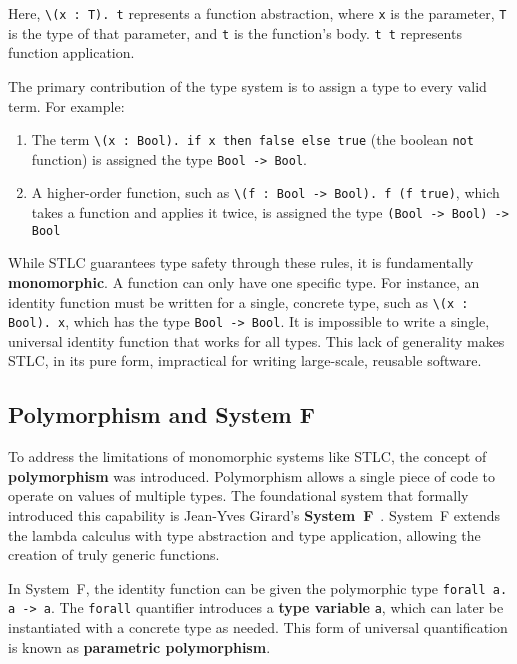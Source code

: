 Here, \texttt{\textbackslash(x : T). t} represents a function abstraction, where \texttt{x} is the parameter, \texttt{T} is the type of that parameter, and \texttt{t} is the function's body. \texttt{t t} represents function application.

The primary contribution of the type system is to assign a type to every valid term. For example:

\begin{enumerate}
    \item The term \texttt{\textbackslash(x : Bool). if x then false else true} (the boolean \texttt{not} function) is assigned the type \texttt{Bool -> Bool}.

    \item A higher-order function, such as \texttt{\textbackslash(f : Bool -> Bool). f (f true)}, which takes a function and applies it twice, is assigned the type \texttt{(Bool -> Bool) -> Bool}
\end{enumerate}

While STLC guarantees type safety through these rules, it is fundamentally \textbf{monomorphic}. A function can only have one specific type. For instance, an identity function must be written for a single, concrete type, such as \texttt{\textbackslash(x : Bool). x}, which has the type \texttt{Bool -> Bool}. It is impossible to write a single, universal identity function that works for all types. This lack of generality makes STLC, in its pure form, impractical for writing large-scale, reusable software.

\subsection{Polymorphism and System F}
\label{chap:LiteratureReview:sec:PolymorphismAndSystemF}

To address the limitations of monomorphic systems like STLC, the concept of \textbf{polymorphism} was introduced. Polymorphism allows a single piece of code to operate on values of multiple types. The foundational system that formally introduced this capability is Jean-Yves Girard's \textbf{System~F}~\cite{girard-system-f}. System~F extends the lambda calculus with type abstraction and type application, allowing the creation of truly generic functions.

In System~F, the identity function can be given the polymorphic type \texttt{forall a. a -> a}. The \texttt{forall} quantifier introduces a \textbf{type variable} \texttt{a}, which can later be instantiated with a concrete type as needed. This form of universal quantification is known as \textbf{parametric polymorphism}.

